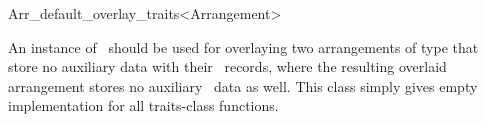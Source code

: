
\ccRefPageBegin

\begin{ccRefClass}{Arr_default_overlay_traits<Arrangement>}

\ccDefinition

An instance of \ccRefName\ should be used for overlaying two arrangements
of type  that store no auxiliary data with their \dcel\
records, where the resulting overlaid arrangement stores no auxiliary
\dcel\ data as well. This class simply gives empty implementation for all
traits-class functions.


\ccIsModel

\ccSeeAlso

\end{ccRefClass}

\ccRefPageEnd
